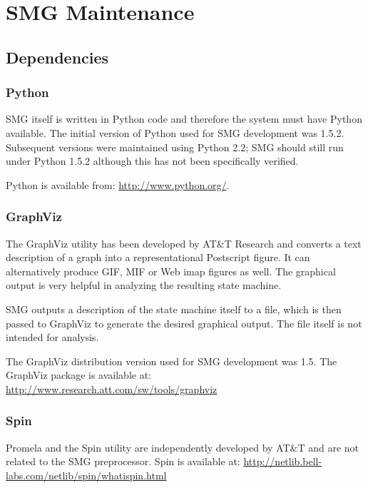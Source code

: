 \section{SMG Maintenance}


\subsection{Dependencies}
\subsubsection{Python}

SMG itself is written in Python code and therefore the system must
have Python available.  The initial version of Python used for SMG
development was 1.5.2.  Subsequent versions were maintained using
Python 2.2; SMG should still run under Python 1.5.2 although this has
not been specifically verified.

Python is available from:
\href{http://www.python.org/}{http://www.python.org/}.



\hypertarget{GraphViz}{\subsubsection{GraphViz}}

The GraphViz utility has been developed by AT\&T Research and converts
a text description of a graph into a representational Postscript
figure.  It can alternatively produce GIF, MIF or Web imap figures as
well.  The graphical output is very helpful in analyzing the resulting state
machine.

SMG outputs a description of the state machine itself to a 
file, which is then passed to GraphViz to generate the desired
graphical output. The  file itself is not intended for
analysis.

The GraphViz distribution version used for SMG development was 1.5.
The GraphViz package is available at:
\href{http://www.research.att.com/sw/tools/graphviz}{http://www.research.att.com/sw/tools/graphviz}


\hypertarget{Spin}{\subsubsection{Spin}}

Promela and the Spin utility are independently developed by AT\&T and
are not related to the SMG preprocessor.  Spin is available at:
\href{http://netlib.bell-labs.com/netlib/spin/whatispin.html}{http://netlib.bell-labs.com/netlib/spin/whatispin.html}


